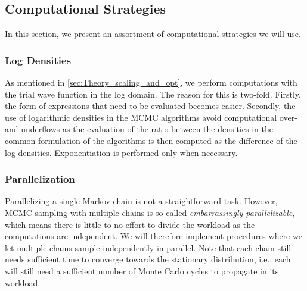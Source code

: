 \subsection{Computational Strategies}

In this section, we present an assortment of computational strategies we will use.

\subsubsection{Log Densities}

As mentioned in \autoref{sec:Theory_scaling_and_opt}, we perform computations with the trial wave function in the log domain. The reason for this is two-fold. Firstly, the form of expressions that need to be evaluated becomes easier. Secondly, the use of logarithmic densities in the MCMC algorithms avoid computational over- and underflows as the evaluation of the ratio between the densities in the common formulation of the algorithms is then computed as the difference of the log densities. %
Exponentiation is performed only when necessary. 

\subsubsection{Parallelization}
Parallelizing a single Markov chain is not a straightforward task. However, MCMC sampling with multiple chains is so-called \textit{embarrassingly parallelizable}, which means there is little to no effort to divide the workload as the computations are independent. We will therefore implement procedures where we let multiple chains sample independently in parallel. Note that each chain still needs sufficient time to converge towards the stationary distribution, i.e., each will still need a sufficient number of Monte Carlo cycles to propagate in its workload. 